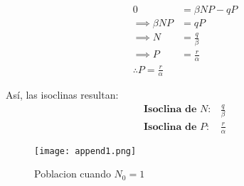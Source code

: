 \documentclass{article}
\begin{document}
\begin{align*}
0 &= \beta NP - qP \\
\implies \beta NP &= qP \\
\implies N &= \frac{q}{\beta} \\
\implies P &= \frac{r}{\alpha} \\
\therefore \boxed{P = \frac{r}{\alpha}}
\end{align*}

Así, las isoclinas resultan:
\begin{align*}
\textbf{Isoclina de }N: &\frac{q}{\beta} \\
\textbf{Isoclina de }P: &\frac{r}{\alpha}
\end{align*}

\vspace{45\baselineskip}


\begin{figure}[ht]
    \centering
    \caption{Poblacion cuando $N_0 = 1$}
    \texttt{[image: append1.png]}
    \label{fig:Image 1.1}
\end{figure}
\end{document}
